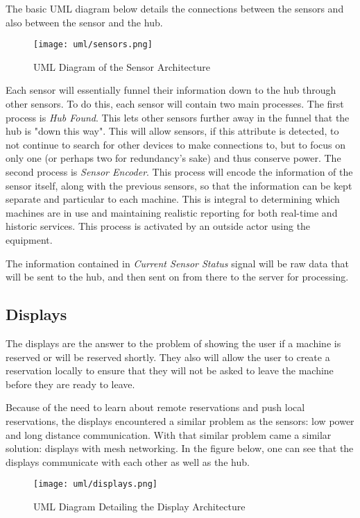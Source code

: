 \documentclass[PPFS.tex]{template/subfiles}
\begin{document}
The basic UML diagram below details the connections between the sensors and also between the sensor and the hub.

\begin{figure}[H]
    \centering
    \texttt{[image: uml/sensors.png]}
    \caption{UML Diagram of the Sensor Architecture}
\end{figure}

Each sensor will essentially funnel their information down to the hub through other sensors. To do this, each sensor will contain two main processes. The first process is \textit{Hub Found}. This lets other sensors further away in the funnel that the hub is "down this way". This will allow sensors, if this attribute is detected, to not continue to search for other devices to make connections to, but to focus on only one (or perhaps two for redundancy's sake) and thus conserve power. The second process is \textit{Sensor Encoder}. This process will encode the information of the sensor itself, along with the previous sensors, so that the information can be kept separate and particular to each machine. This is integral to determining which machines are in use and maintaining realistic reporting for both real-time and historic services. This process is activated by an outside actor using the equipment.

The information contained in \textit{Current Sensor Status} signal will be raw data that will be sent to the hub, and then sent on from there to the server for processing.

\subsection{Displays}

The displays are the answer to the problem of showing the user if a machine is reserved or will be reserved shortly. They also will allow the user to create a reservation locally to ensure that they will not be asked to leave the machine before they are ready to leave.


Because of the need to learn about remote reservations and push local reservations, the displays encountered a similar problem as the sensors: low power and long distance communication. With that similar problem came a similar solution: displays with mesh networking. In the figure below, one can see that the displays communicate with each other as well as the hub.

\begin{figure}[H]
    \centering
    \texttt{[image: uml/displays.png]}
    \caption{UML Diagram Detailing the Display Architecture}
\end{figure}
\end{document}
